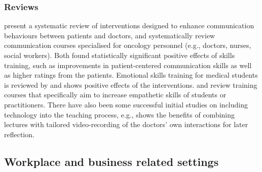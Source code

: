 \documentclass[prodmode,acmtochi]{acmsmall}
\newcommand{\todo}[1]{\textrm{\textrm{\textcolor{LightBlue}{[[#1]]}}}}
\newcommand{\GeraldineFIX}[1]{}
\begin{document}
\GeraldineFIX{ G: say what technology how used in a sentence???}
\GeraldineFIX{ G: this doesn't seem to be empathy but about self awareness/regulation?  ... P: Is this a bit better? 
I'm drawing on the reviews and the concerns they use in this space -- in my reading it is also around objectification of the patient etc... where regulation is obviously important, but also as a part of being able to emphasise in these cases without burn-out etc. .. I think it might be too complex to go into details here (especially given what a tangled mess empathy as a concept is :)}

\subsubsection*{Reviews}  present a systematic review of interventions designed to enhance communication behaviours between patients and doctors, and  systematically review communication courses specialised for oncology personnel (e.g., doctors, nurses, social workers). Both  found statistically significant positive effects of skills training, such as improvements in patient-centered communication skills as well as higher ratings from the patients. Emotional skills training for medical students is reviewed by \cite{Satterfield2007} and shows positive effects of the interventions.  and  review training courses that specifically aim to increase empathetic skills of students or practitioners. There have also been some successful initial studies
on including technology into the teaching process, e.g., 
shows the benefits of combining lectures with tailored video-recording of
the doctors' own interactions for later reflection.


\subsection{Workplace and business related settings}
\end{document}
